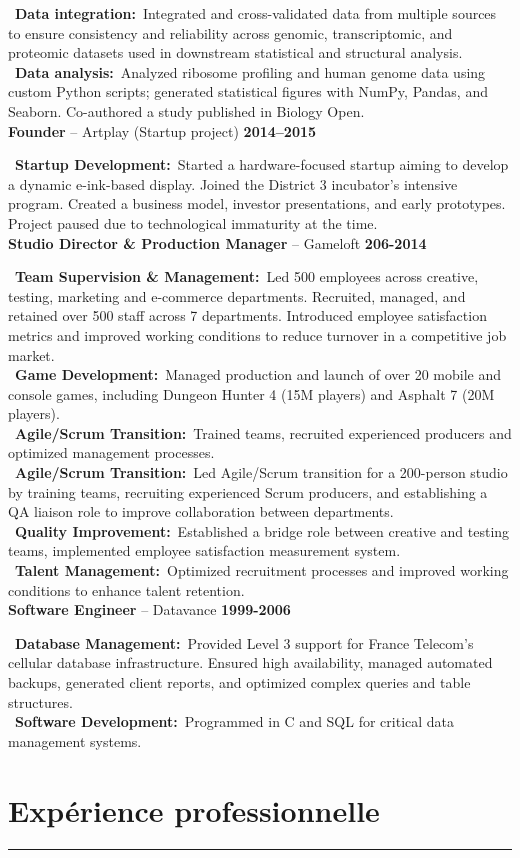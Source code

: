 \documentclass[a4paper,10pt]{article}
\newif\ifpandocconvert
\newcommand{\resumeSection}[2]{%
  \ifpandocconvert %
    \par\addvspace{1em}\noindent\textbf{#1}\par\addvspace{0.5em}%
    #2%
    \par\addvspace{0.3em}%
  \else %
    \section*{#1}%
    \vspace{-2em} %
    \noindent\rule{\textwidth}{0.4pt}%
    \vspace{0.5em} %
    #2%
    \vspace{0.3em}%
  \fi
}
\newcommand{\resumeItem}[3]{%
  \noindent\textbf{#1} -- #2 \hfill \textbf{#3} \\
  \vspace{0.3em}
}
\newcommand{\jobItem}[2]{%
  \noindent
  \textbullet\ \textbf{#1\ifthenelse{\boolean{EN}}{}{ }:}~#2\vspace{0.3em} \\
}
\begin{document}
{{    \jobItem{Data integration}{Integrated and cross-validated data from multiple sources to ensure consistency and reliability across genomic, transcriptomic, and proteomic datasets used in downstream statistical and structural analysis.}
    \jobItem{Data analysis}{Analyzed ribosome profiling and human genome data using custom Python scripts; generated statistical figures with NumPy, Pandas, and Seaborn. Co-authored a study published in Biology Open.}
    \vspace{1em}
    \resumeItem{Founder}{Artplay (Startup project)}{2014–2015}
    \jobItem{Startup Development}{Started a hardware-focused startup aiming to develop a dynamic e-ink-based display. Joined the District 3 incubator’s intensive program. Created a business model, investor presentations, and early prototypes. Project paused due to technological immaturity at the time.}
    \vspace{1em}
    \resumeItem{Studio Director \& Production Manager}{Gameloft}{206-2014}
    \jobItem{Team Supervision \& Management}{Led 500 employees across creative, testing, marketing and e-commerce departments. Recruited, managed, and retained over 500 staff across 7 departments. Introduced employee satisfaction metrics and improved working conditions to reduce turnover in a competitive job market.}
    \jobItem{Game Development}{Managed production and launch of over 20 mobile and console games, including Dungeon Hunter 4 (15M players) and Asphalt 7 (20M players).}
    \jobItem{Agile/Scrum Transition}{Trained teams, recruited experienced producers and optimized management processes.}
    \jobItem{Agile/Scrum Transition}{Led Agile/Scrum transition for a 200-person studio by training teams, recruiting experienced Scrum producers, and establishing a QA liaison role to improve collaboration between departments.}
    \jobItem{Quality Improvement}{Established a bridge role between creative and testing teams, implemented employee satisfaction measurement system.}
    \jobItem{Talent Management}{Optimized recruitment processes and improved working conditions to enhance talent retention.}
    \vspace{1em}
    \resumeItem{Software Engineer}{Datavance}{1999-2006}
    \jobItem{Database Management}{Provided Level 3 support for France Telecom's cellular database infrastructure. Ensured high availability, managed automated backups, generated client reports, and optimized complex queries and table structures.}
    \jobItem{Software Development}{Programmed in C and SQL for critical data management systems.}
  }
}{%
  \resumeSection{Expérience professionnelle}{
}}
\end{document}
